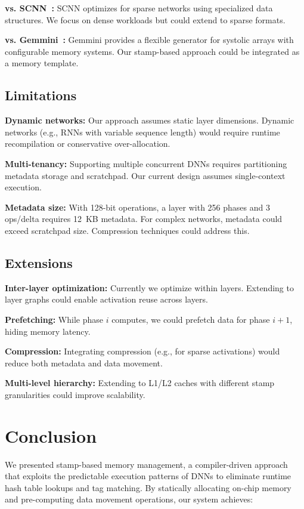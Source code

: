\documentclass[conference]{IEEEtran}
\begin{document}
\textbf{vs. SCNN~\cite{parashar2017scnn}:} SCNN optimizes for sparse networks using specialized data structures. We focus on dense workloads but could extend to sparse formats.

\textbf{vs. Gemmini~\cite{genc2021gemmini}:} Gemmini provides a flexible generator for systolic arrays with configurable memory systems. Our stamp-based approach could be integrated as a memory template.

\subsection{Limitations}

\textbf{Dynamic networks:} Our approach assumes static layer dimensions. Dynamic networks (e.g., RNNs with variable sequence length) would require runtime recompilation or conservative over-allocation.

\textbf{Multi-tenancy:} Supporting multiple concurrent DNNs requires partitioning metadata storage and scratchpad. Our current design assumes single-context execution.

\textbf{Metadata size:} With 128-bit operations, a layer with 256 phases and 3 ops/delta requires 12~KB metadata. For complex networks, metadata could exceed scratchpad size. Compression techniques could address this.

\subsection{Extensions}

\textbf{Inter-layer optimization:} Currently we optimize within layers. Extending to layer graphs could enable activation reuse across layers.

\textbf{Prefetching:} While phase $i$ computes, we could prefetch data for phase $i+1$, hiding memory latency.

\textbf{Compression:} Integrating compression (e.g., for sparse activations) would reduce both metadata and data movement.

\textbf{Multi-level hierarchy:} Extending to L1/L2 caches with different stamp granularities could improve scalability.

\section{Conclusion}

We presented stamp-based memory management, a compiler-driven approach that exploits the predictable execution patterns of DNNs to eliminate runtime hash table lookups and tag matching. By statically allocating on-chip memory and pre-computing data movement operations, our system achieves:
\end{document}

